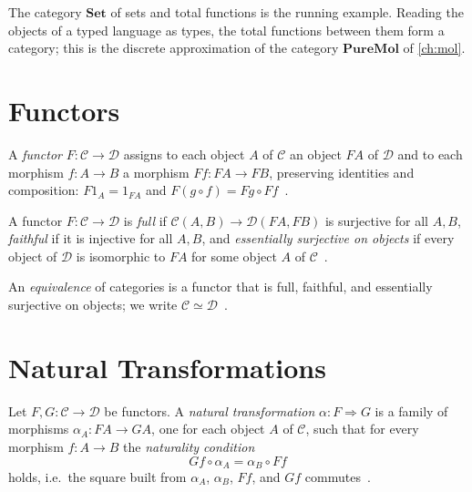 \begin{example}
The category $\mathbf{Set}$ of sets and total functions is the running
example. Reading the objects of a typed language as types, the total
functions between them form a category; this is the discrete approximation of
the category $\mathbf{PureMol}$ of \autoref{ch:mol}.
\end{example}

\section{Functors}\label{sec:prelim-func}

\begin{definition}[Functor]
A \emph{functor} $F \colon \mathcal{C} \to \mathcal{D}$ assigns to each
object $A$ of $\mathcal{C}$ an object $F A$ of $\mathcal{D}$ and to each
morphism $f \colon A \to B$ a morphism $F f \colon F A \to F B$, preserving
identities and composition:
$F 1_A = 1_{F A}$ and $F (g \circ f) = F g \circ F f$~\cite{maclane}.
\end{definition}

\begin{definition}
A functor $F \colon \mathcal{C} \to \mathcal{D}$ is \emph{full} if
$\mathcal{C} (A,B) \to \mathcal{D} (F A, F B)$ is surjective for all $A, B$,
\emph{faithful} if it is injective for all $A, B$, and \emph{essentially
surjective on objects} if every object of $\mathcal{D}$ is isomorphic to
$F A$ for some object $A$ of $\mathcal{C}$~\cite{maclane}.
\end{definition}

\begin{definition}
An \emph{equivalence} of categories is a functor that is full, faithful, and
essentially surjective on objects; we write $\mathcal{C} \simeq
\mathcal{D}$~\cite{maclane}.
\end{definition}

\section{Natural Transformations}\label{sec:prelim-nat}

\begin{definition}
Let $F, G \colon \mathcal{C} \to \mathcal{D}$ be functors. A \emph{natural
transformation} $\alpha \colon F \Rightarrow G$ is a family of morphisms
$\alpha_A \colon F A \to G A$, one for each object $A$ of $\mathcal{C}$, such
that for every morphism $f \colon A \to B$ the \emph{naturality condition}
\[ G f \circ \alpha_A = \alpha_B \circ F f \]
holds, i.e.\ the square built from $\alpha_A$, $\alpha_B$, $F f$, and $G f$
commutes~\cite{maclane}.
\end{definition}

